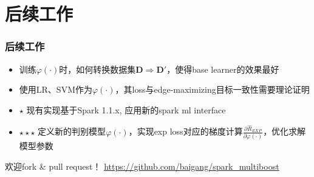 \documentclass{beamer}
\begin{document}
\section{后续工作}

\begin{frame}
\frametitle{后续工作}

\begin{itemize}
\item 训练$\varphi(\cdot)$时，如何转换数据集$\mathbf{D} \Rightarrow \mathbf{D}'$，使得base learner的效果最好
\item 使用LR、SVM作为$\varphi(\cdot)$，其loss与edge-maximizing目标一致性需要理论证明
\item $\star$ 现有实现基于Spark 1.1.x, 应用新的spark ml interface
\item $\star \star \star$ 定义新的判别模型$\varphi(\cdot)$，实现exp loss对应的梯度计算$\frac{\partial \hat{R}_{EXP}}{\partial \varphi(\cdot)}$，优化求解模型参数
\end{itemize}

\begin{block}{欢迎fork \& pull request！}
\url{https://github.com/baigang/spark_multiboost}
\end{block}

\end{frame}
\end{document}
